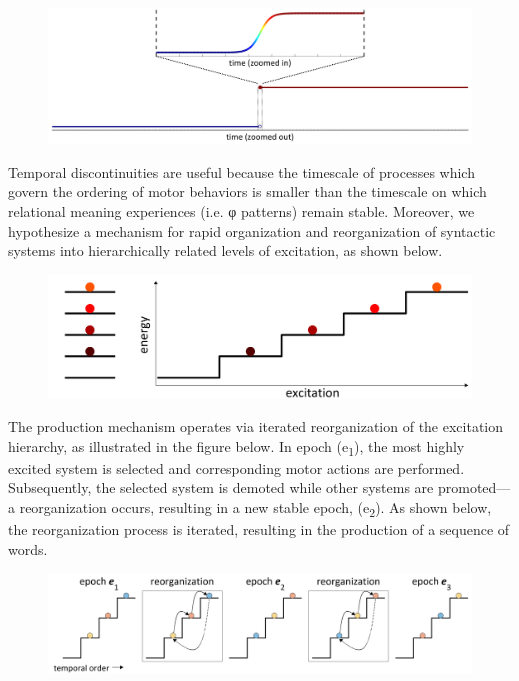   
\begin{figure}
\includegraphics[width=\textwidth]{figures/Tilsen-img4.png}
\caption{\missingcaption}
\label{fig:}
\end{figure}
 

  Temporal discontinuities are useful because the timescale of processes which govern the ordering of motor behaviors is smaller than the timescale on which relational meaning experiences (i.e. φ patterns) remain stable. Moreover, we hypothesize a mechanism for rapid organization and reorganization of syntactic systems into hierarchically related levels of excitation, as shown below.

  
\begin{figure}
\includegraphics[width=\textwidth]{figures/Tilsen-img5.png}
\caption{\missingcaption}
\label{fig:}
\end{figure}
 

  The production mechanism operates via iterated reorganization of the excitation hierarchy, as illustrated in the figure below. In epoch (e\textsubscript{1}), the most highly excited system is selected and corresponding motor actions are performed. Subsequently, the selected system is demoted while other systems are promoted—a reorganization occurs, resulting in a new stable epoch, (e\textsubscript{2}). As shown below, the reorganization process is iterated, resulting in the production of a sequence of words.

  
\begin{figure}
\includegraphics[width=\textwidth]{figures/Tilsen-img6.png}
\caption{\missingcaption}
\label{fig:}
\end{figure}
 

